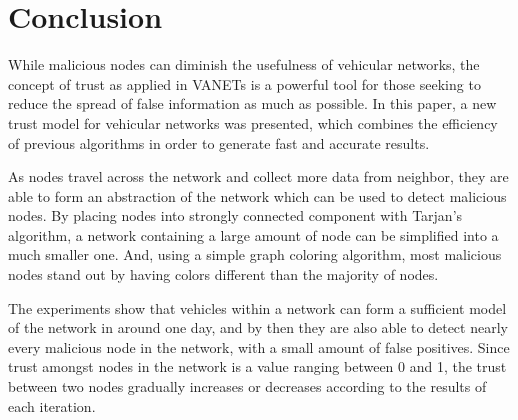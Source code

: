\documentclass[conference]{IEEEtran}
\begin{document}




\section{Conclusion}
\label{section:conclusion}

While malicious nodes can diminish the usefulness of vehicular networks, the concept of trust as applied in VANETs is a powerful tool for those seeking to reduce the spread of false information as much as possible.
In this paper, a new trust model for vehicular networks was presented, which combines the efficiency of previous algorithms in order to generate fast and accurate results.

As nodes travel across the network and collect more data from neighbor, they are able to form an abstraction of the network which can be used to detect malicious nodes.
By placing nodes into strongly connected component with Tarjan's algorithm, a network containing a large amount of node can be simplified into a much smaller one.
And, using a simple graph coloring algorithm, most malicious nodes stand out by having colors different than the majority of nodes.

The experiments show that vehicles within a network can form a sufficient model of the network in around one day, and by then they are also able to detect nearly every malicious node in the network, with a small amount of false positives.
Since trust amongst nodes in the network is a value ranging between 0 and 1, the trust between two nodes gradually increases or decreases according to the results of each iteration.



%
%
\end{document}
